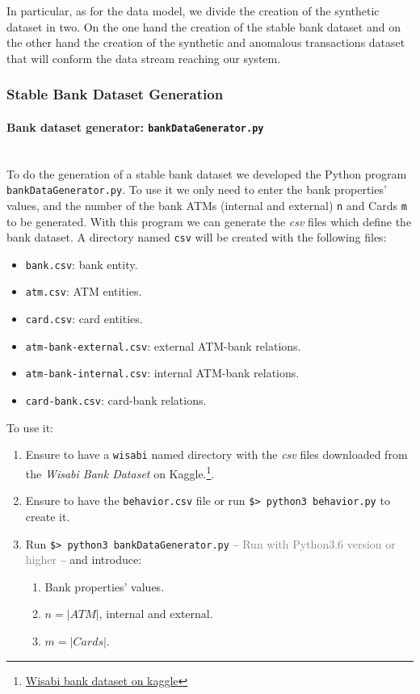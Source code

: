 In particular, as for the data model, we divide the creation of the synthetic dataset in two. On the one hand the creation of the stable bank dataset and on the other hand the creation of the synthetic and anomalous transactions dataset that will conform the data stream reaching our system.

\subsubsection*{Stable Bank Dataset Generation}

\paragraph{Bank dataset generator: \texttt{bankDataGenerator.py}\\\\}\label{bankDataGenerator}
To do the generation of a stable bank dataset we developed the Python program \texttt{bankDataGenerator.py}. 
To use it we only need to enter the bank properties' values, and the number of the bank ATMs (internal and external) \texttt{n} and Cards \texttt{m} to be generated. With this program we can generate the \emph{csv} files which define the bank dataset. A directory named \texttt{csv} will be created with the following files: 

\begin{itemize}
    \item \texttt{bank.csv}: bank entity.
    \item \texttt{atm.csv}: ATM entities.
    \item \texttt{card.csv}: card entities.
    \item \texttt{atm-bank-external.csv}: external ATM-bank relations.
    \item \texttt{atm-bank-internal.csv}: internal ATM-bank relations.
    \item \texttt{card-bank.csv}: card-bank relations.
\end{itemize}
To use it:

\begin{enumerate}
    \item Ensure to have a \texttt{wisabi} named directory with the \emph{csv} files downloaded from the \emph{Wisabi Bank Dataset} on Kaggle.\footnote{\href{https://www.kaggle.com/datasets/obinnaiheanachor/wisabi-bank-dataset}{Wisabi bank dataset on kaggle}}.
    \item Ensure to have the \texttt{behavior.csv} file or run \texttt{\$> python3 behavior.py} to create it.
    \item Run \texttt{\$> python3 bankDataGenerator.py} -- \textcolor{gray}{Run with Python3.6 version or higher} -- and introduce:
    \begin{enumerate}
        \item Bank properties' values.
        \item $n = |ATM|$, internal and external.
        \item $m = |Cards|$.
    \end{enumerate}
\end{enumerate}

